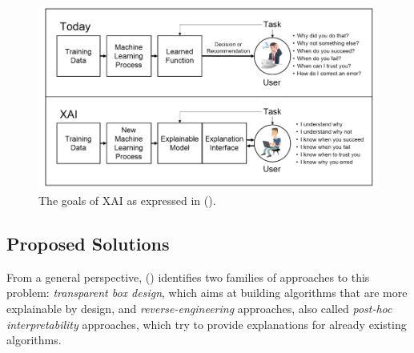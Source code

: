 \documentclass[conference]{IEEEtran}
\begin{document}
\begin{figure}[h!] \includegraphics[width=\linewidth]{images/xai.png}
    \caption{The goals of XAI as expressed in (\cite{DARPA}). } \label{fig:xai}
\end{figure}

\subsection{Proposed Solutions}
\label{sec:solutions}




From a general perspective, (\cite{Giannotti}) identifies two families of
approaches to this problem: \textit{transparent box design}, which aims at
building algorithms that are more explainable by design, and
\textit{reverse-engineering} approaches, also called \textit{post-hoc
    interpretability} approaches, which try to provide explanations for already
existing algorithms.
\end{document}
